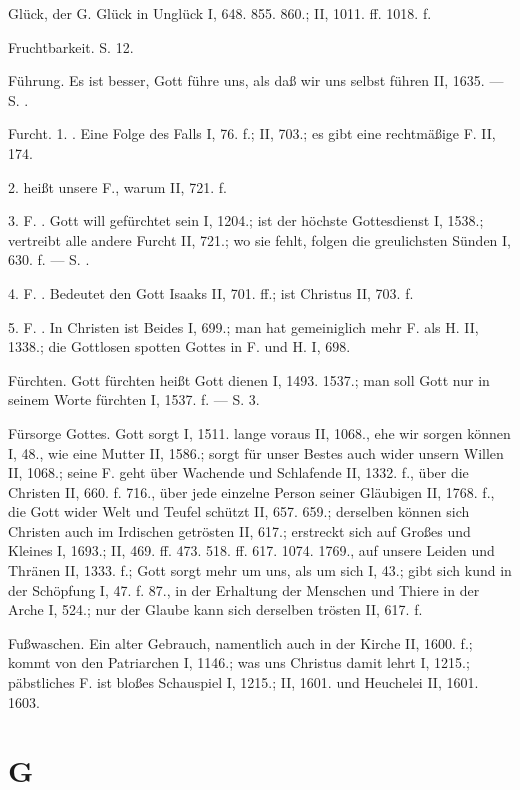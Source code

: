 Glück, der G. Glück in Unglück I, 648. 855. 860.; II, 1011. ff. 1018. f.

Fruchtbarkeit. S.  12.

Führung. Es ist besser, Gott führe uns, als daß wir uns selbst führen II, 1635. — S. .

Furcht. 1. . Eine Folge des Falls I, 76. f.; II, 703.; es gibt eine rechtmäßige F. II, 174.

2.  heißt unsere F., warum II, 721. f.

3. F. . Gott will gefürchtet sein I, 1204.; ist der höchste Gottesdienst I, 1538.; vertreibt alle andere Furcht II, 721.; wo sie fehlt, folgen die greulichsten Sünden I, 630. f. — S. .

4. F. . Bedeutet den Gott Isaaks II, 701. ff.; ist Christus II, 703. f.

5. F. . In Christen ist Beides I, 699.; man hat gemeiniglich mehr F. als H. II, 1338.; die Gottlosen spotten Gottes in F. und H. I, 698.

Fürchten. Gott fürchten heißt Gott dienen I, 1493. 1537.; man soll Gott nur in seinem Worte fürchten I, 1537. f. — S.  3.

Fürsorge Gottes. Gott sorgt I, 1511. lange voraus II, 1068., ehe wir sorgen können I, 48., wie eine Mutter II, 1586.; sorgt für unser Bestes auch wider unsern Willen II, 1068.; seine F. geht über Wachende und Schlafende II, 1332. f., über die Christen II, 660. f. 716., über jede einzelne Person seiner Gläubigen II, 1768. f., die Gott wider Welt und Teufel schützt II, 657. 659.; derselben können sich Christen auch im Irdischen getrösten II, 617.; erstreckt sich auf Großes und Kleines I, 1693.; II, 469. ff. 473. 518. ff. 617. 1074. 1769., auf unsere Leiden und Thränen II, 1333. f.; Gott sorgt mehr um uns, als um sich I, 43.; gibt sich kund in der Schöpfung I, 47. f. 87., in der Erhaltung der Menschen und Thiere in der Arche I, 524.; nur der Glaube kann sich derselben trösten II, 617. f.

Fußwaschen. Ein alter Gebrauch, namentlich auch in der Kirche II, 1600. f.; kommt von den Patriarchen I, 1146.; was uns Christus damit lehrt I, 1215.; päbstliches F. ist bloßes Schauspiel I, 1215.; II, 1601. und Heuchelei II, 1601. 1603.

\section{G}

